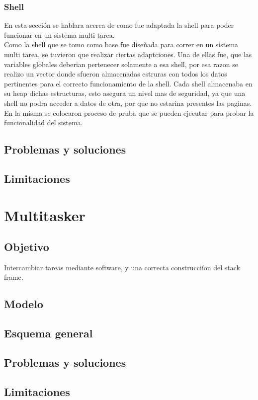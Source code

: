 \documentclass[10pt,a4paper]{article}
\begin{document}
	\subsubsection{Shell}
	En esta secci\'on se hablara acerca de como fue adaptada la shell para poder funcionar en un sistema multi tarea. \\ 
	Como la shell que se tomo como base fue dise\~nada para correr en un sistema multi tarea, se tuvieron que realizar ciertas adaptciones. Una de ellas fue, que las variables globales deberian pertenecer solamente a esa shell, por esa razon se realizo un vector donde sfueron almacenadas estruras con todos los datos pertinentes para el correcto funcionamiento de la shell. Cada shell almacenaba en su heap dichas estructuras, esto asegura un nivel mas de seguridad, ya que una shell no podra acceder a datos de otra, por que no estarina presentes las paginas. \\
	En la misma se colocaron proceso de pruba que se pueden ejecutar para probar la funcionalidad del sistema.

	\subsection{Problemas y soluciones}
	\subsection{Limitaciones}
	


\section{Multitasker}
	\subsection{Objetivo}
	Intercambiar tareas mediante software, y una correcta construcci\'ion del stack frame.
	\subsection{Modelo}
	\subsection{Esquema general}
	\subsection{Problemas y soluciones}
	\subsection{Limitaciones}
\end{document}
